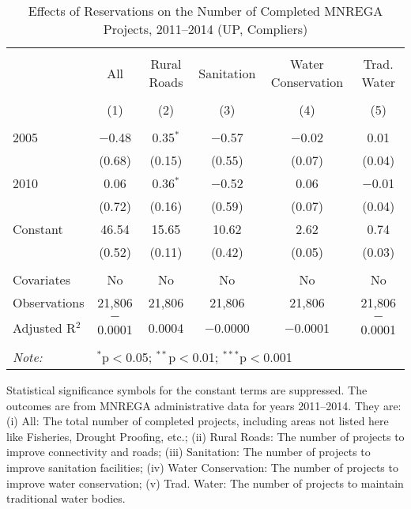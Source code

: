 \begin{table}[!htbp]
\centering
\begin{threeparttable}

  \caption{Effects of Reservations on the Number of Completed MNREGA Projects, 2011--2014 (UP, Compliers)} 
  \label{main_mnrega_up_2005_2010_compliers} 
\scriptsize 
\begin{tabular}{@{\extracolsep{0pt}}lccccc} 
\\[-1.8ex]\hline 
\hline \\[-1.8ex] 
 & All & Rural Roads & Sanitation & Water Conservation & Trad. Water \\ 
\\[-1.8ex] & (1) & (2) & (3) & (4) & (5)\\ 
\hline \\[-1.8ex] 
 2005 & $-$0.48 & 0.35$^{*}$ & $-$0.57 & $-$0.02 & 0.01 \\ 
  & (0.68) & (0.15) & (0.55) & (0.07) & (0.04) \\ 
  2010 & 0.06 & 0.36$^{*}$ & $-$0.52 & 0.06 & $-$0.01 \\ 
  & (0.72) & (0.16) & (0.59) & (0.07) & (0.04) \\ 
  Constant & 46.54 & 15.65 & 10.62 & 2.62 & 0.74 \\ 
  & (0.52) & (0.11) & (0.42) & (0.05) & (0.03) \\ 
 \hline \\[-1.8ex] 
Covariates & No & No & No & No & No \\ 
Observations & 21,806 & 21,806 & 21,806 & 21,806 & 21,806 \\ 
Adjusted R$^{2}$ & $-$0.0001 & 0.0004 & $-$0.0000 & $-$0.0001 & $-$0.0001 \\ 
\hline 
\hline \\[-1.8ex] 
\textit{Note:}  & \multicolumn{5}{l}{$^{*}$p$<$0.05; $^{**}$p$<$0.01; $^{***}$p$<$0.001} \\ 
\end{tabular} 
\begin{tablenotes}[flushleft]
\scriptsize
\item[] Statistical significance symbols for the constant terms are suppressed. The outcomes are from MNREGA administrative data for years 2011--2014. They are: 
(i) All: The total number of completed projects, including areas not listed here like Fisheries, Drought Proofing, etc.;
(ii) Rural Roads: The number of projects to improve connectivity and roads;
(iii) Sanitation: The number of projects to improve sanitation facilities;
(iv) Water Conservation: The number of projects to improve water conservation;
(v) Trad. Water: The number of projects to maintain traditional water bodies.
\end{tablenotes}
\end{threeparttable}
\end{table}
